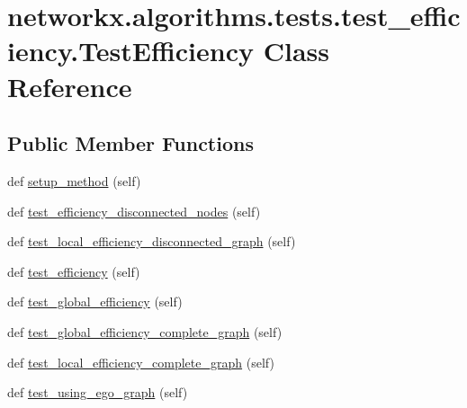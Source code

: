 \hypertarget{classnetworkx_1_1algorithms_1_1tests_1_1test__efficiency_1_1TestEfficiency}{}\section{networkx.\+algorithms.\+tests.\+test\+\_\+efficiency.\+Test\+Efficiency Class Reference}
\label{classnetworkx_1_1algorithms_1_1tests_1_1test__efficiency_1_1TestEfficiency}
\subsection*{Public Member Functions}
\begin{DoxyCompactItemize}
\item 
def \hyperlink{classnetworkx_1_1algorithms_1_1tests_1_1test__efficiency_1_1TestEfficiency_aae6b68fc31a81ff8cd990f344b4fd78a}{setup\+\_\+method} (self)
\item 
def \hyperlink{classnetworkx_1_1algorithms_1_1tests_1_1test__efficiency_1_1TestEfficiency_a27db30fa9174149e25b1b62d34263d5c}{test\+\_\+efficiency\+\_\+disconnected\+\_\+nodes} (self)
\item 
def \hyperlink{classnetworkx_1_1algorithms_1_1tests_1_1test__efficiency_1_1TestEfficiency_ac1b370e3797bfc343d6e7aa67e329f9a}{test\+\_\+local\+\_\+efficiency\+\_\+disconnected\+\_\+graph} (self)
\item 
def \hyperlink{classnetworkx_1_1algorithms_1_1tests_1_1test__efficiency_1_1TestEfficiency_a53dc7439bb429eb92c8b6e9915b2a99e}{test\+\_\+efficiency} (self)
\item 
def \hyperlink{classnetworkx_1_1algorithms_1_1tests_1_1test__efficiency_1_1TestEfficiency_afecd34c3f9aa5940ccdd8c21d3157c87}{test\+\_\+global\+\_\+efficiency} (self)
\item 
def \hyperlink{classnetworkx_1_1algorithms_1_1tests_1_1test__efficiency_1_1TestEfficiency_a0248b0a58cd512243c007da91a2cbab1}{test\+\_\+global\+\_\+efficiency\+\_\+complete\+\_\+graph} (self)
\item 
def \hyperlink{classnetworkx_1_1algorithms_1_1tests_1_1test__efficiency_1_1TestEfficiency_a03e35a4c0d17c02c9345aa9b08f700d9}{test\+\_\+local\+\_\+efficiency\+\_\+complete\+\_\+graph} (self)
\item 
def \hyperlink{classnetworkx_1_1algorithms_1_1tests_1_1test__efficiency_1_1TestEfficiency_ae019d028891ab96fa6377966536584de}{test\+\_\+using\+\_\+ego\+\_\+graph} (self)
\end{DoxyCompactItemize}
